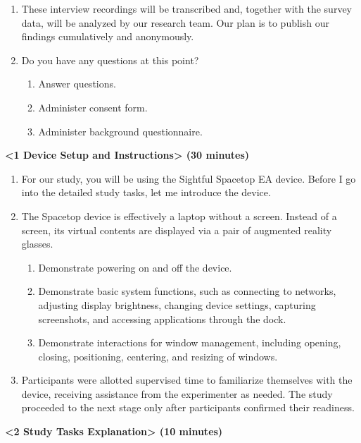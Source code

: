 \begin{enumerate}[label=(\arabic*)]
\item These interview recordings will be transcribed and, together with the survey data, will be analyzed by our research team. Our plan is to publish our findings cumulatively and anonymously.

\item Do you have any questions at this point?
\begin{enumerate}
\item Answer questions.
\item Administer consent form.
\item Administer background questionnaire.
\end{enumerate}
\end{enumerate}

\textbf{<1 Device Setup and Instructions> (30 minutes)}

\begin{enumerate}[label=(\arabic*)]
\item For our study, you will be using the Sightful Spacetop EA device. Before I go into the detailed study tasks, let me introduce the device.

\item The Spacetop device is effectively a laptop without a screen. Instead of a screen, its virtual contents are displayed via a pair of augmented reality glasses. 

\begin{enumerate}
\item Demonstrate powering on and off the device.
\item Demonstrate basic system functions, 
such as connecting to networks, 
adjusting display brightness,
changing device settings, capturing screenshots, 
and accessing applications through the dock.
\item Demonstrate interactions for window management, including opening, closing, positioning, centering, and resizing of windows.
\end{enumerate}

\item Participants were allotted supervised time to familiarize themselves with the device, receiving assistance from the experimenter as needed. The study proceeded to the next stage only after participants confirmed their readiness.
\end{enumerate}

\textbf{<2 Study Tasks Explanation> (10 minutes)}

